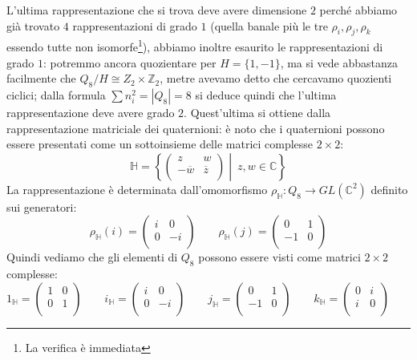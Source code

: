 \documentclass[11pt]{article}
\theoremstyle{plain}
\theoremstyle{definition}
\theoremstyle{remark}
\newcommand{\C}{\mathbb{C}}
\newcommand{\Z}{\mathbb{Z}}
\newcommand{\HH}{\mathbb{H}}
\begin{document}
L'ultima rappresentazione che si trova deve avere dimensione $2$ perché abbiamo già trovato $4$ rappresentazioni di grado $1$ (quella banale più le tre $\rho_i, \rho_j, \rho_k$ essendo tutte non isomorfe\footnote{La verifica è immediata}), abbiamo inoltre esaurito le rappresentazioni di grado $1$: potremmo ancora quozientare per $H=\{ 1, -1 \}$, ma si vede abbastanza facilmente che $Q_8/H\cong Z_2\times\Z_2$, metre avevamo detto che cercavamo quozienti ciclici; dalla formula $\sum n_i^2=|Q_8| = 8$ si deduce quindi che l'ultima rappresentazione deve avere grado $2$. Quest'ultima si ottiene dalla rappresentazione matriciale dei quaternioni: è noto che i quaternioni possono essere presentati come un sottoinsieme delle matrici complesse $2\times 2$:
\[
	\HH = \left\{ 
		\begin{pmatrix}
	              	z & w\\
	              	-\overline{w} & \overline{z}\\
	              \end{pmatrix}
	              \middle|\ z,w\in \C
		\right\}
\]
La rappresentazione è determinata dall'omomorfismo $\rho_{\HH}:Q_8\to GL(\C^2)$ definito sui generatori:
\[
	\rho_{\HH}(i) = \begin{pmatrix}
	          	i & 0\\
	          	0 & -i\\
	          \end{pmatrix}
	\qquad
	\rho_{\HH}(j) = \begin{pmatrix}
	          	0 & 1\\
	          	-1& 0\\
	          \end{pmatrix}
\]
Quindi vediamo che gli elementi di $Q_8$ possono essere visti come matrici $2\times2$ complesse:
\[ 
1_\HH = 
\left(
\begin{array}{cc}
1 & 0 \\
0 & 1 \\
\end{array}
\right)
\qquad
i_\HH = 
\left(
\begin{array}{cc}
i & 0 \\
0 & -i \\
\end{array}
\right)
\qquad
j_\HH = 
\left(
\begin{array}{cc}
0 & 1 \\
-1 & 0 \\
\end{array}
\right)
\qquad
k_\HH =
\left(
\begin{array}{cc}
0 & i \\
i & 0 \\
\end{array}
\right)
\qquad
\]
\end{document}

